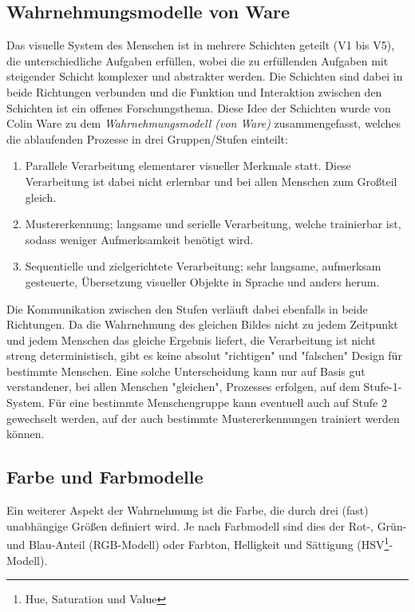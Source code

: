 		\subsection{Wahrnehmungsmodelle von Ware}
			\label{subsec:wahrnehmungWare}

			Das visuelle System des Menschen ist in mehrere Schichten geteilt (V1 bis V5), die unterschiedliche Aufgaben erfüllen, wobei die zu erfüllenden Aufgaben mit steigender Schicht komplexer und abstrakter werden. Die Schichten sind dabei in beide Richtungen verbunden und die Funktion und Interaktion zwischen den Schichten ist ein offenes Forschungsthema. Diese Idee der Schichten wurde von Colin Ware zu dem \emph{Wahrnehmungsmodell (von Ware)} zusammengefasst, welches die ablaufenden Prozesse in drei Gruppen/Stufen einteilt:
			\begin{enumerate}
				\item Parallele Verarbeitung elementarer visueller Merkmale statt. Diese Verarbeitung ist dabei nicht erlernbar und bei allen Menschen zum Großteil gleich.
				\item Mustererkennung; langsame und serielle Verarbeitung, welche trainierbar ist, sodass weniger Aufmerksamkeit benötigt wird.
				\item Sequentielle und zielgerichtete Verarbeitung; sehr langsame, aufmerksam gesteuerte, Übersetzung visueller Objekte in Sprache und anders herum.
			\end{enumerate}
			Die Kommunikation zwischen den Stufen verläuft dabei ebenfalls in beide Richtungen. Da die Wahrnehmung des gleichen Bildes nicht zu jedem Zeitpunkt und jedem Menschen das gleiche Ergebnis liefert, \dh die Verarbeitung ist nicht streng deterministisch, gibt es keine absolut "richtigen" und "falschen" Design für bestimmte Menschen. Eine solche Unterscheidung kann nur auf Basis gut verstandener, bei allen Menschen "gleichen", Prozesses erfolgen, \dh auf dem Stufe-1-System. Für eine bestimmte Menschengruppe kann eventuell auch auf Stufe 2 gewechselt werden, auf der auch bestimmte Mustererkennungen trainiert werden können.

		\subsection{Farbe und Farbmodelle}
			\label{subsec:farbe}

			Ein weiterer Aspekt der Wahrnehmung ist die Farbe, die durch drei (fast) unabhängige Größen definiert wird. Je nach Farbmodell sind dies \bspw der Rot-, Grün- und Blau-Anteil (RGB-Modell) oder Farbton, Helligkeit und Sättigung (HSV\footnote{Hue, Saturation und Value}-Modell).

